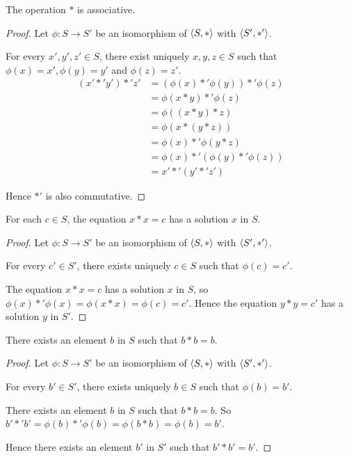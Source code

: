 \begin{exercise}
    The operation $*$ is associative.
\end{exercise}

\begin{proof}
    Let $\phi: S\to S'$ be an isomorphism of $\left\langle{S, *}\right\rangle$ with $\left\langle{S', *'}\right\rangle$.

    For every $x', y', z'\in S$, there exist uniquely $x, y, z\in S$ such that $\phi(x) = x', \phi(y) = y'$ and $\phi(z) = z'$.
    \begin{align*}
        (x' *' y') *' z' & = (\phi(x) *' \phi(y)) *' \phi(z) \\
                         & = \phi(x * y) *' \phi(z)          \\
                         & = \phi((x * y) * z)               \\
                         & = \phi(x * (y * z))               \\
                         & = \phi(x) *' \phi(y * z)          \\
                         & = \phi(x) *' (\phi(y) *' \phi(z)) \\
                         & = x' *' (y' *' z')
    \end{align*}

    Hence $*'$ is also commutative.
\end{proof}

\begin{exercise}
    For each $c\in S$, the equation $x * x = c$ has a solution $x$ in $S$.
\end{exercise}

\begin{proof}
    Let $\phi: S\to S'$ be an isomorphism of $\left\langle{S, *}\right\rangle$ with $\left\langle{S', *'}\right\rangle$.

    For every $c'\in S'$, there exists uniquely $c\in S$ such that $\phi(c) = c'$.

    The equation $x * x = c$ has a solution $x$ in $S$, so $\phi(x) *' \phi(x) = \phi(x * x) = \phi(c) = c'$. Hence the equation $y * y = c'$ has a solution $y$ in $S'$.
\end{proof}

\begin{exercise}
    There exists an element $b$ in $S$ such that $b * b = b$.
\end{exercise}

\begin{proof}
    Let $\phi: S\to S'$ be an isomorphism of $\left\langle{S, *}\right\rangle$ with $\left\langle{S', *'}\right\rangle$.

    For every $b'\in S'$, there exists uniquely $b\in S$ such that $\phi(b) = b'$.

    There exists an element $b$ in $S$ such that $b * b = b$. So $b' *' b' = \phi(b) *' \phi(b) = \phi(b * b) = \phi(b) = b'$.

    Hence there exists an element $b'$ in $S'$ such that $b' * b' = b'$.
\end{proof}

